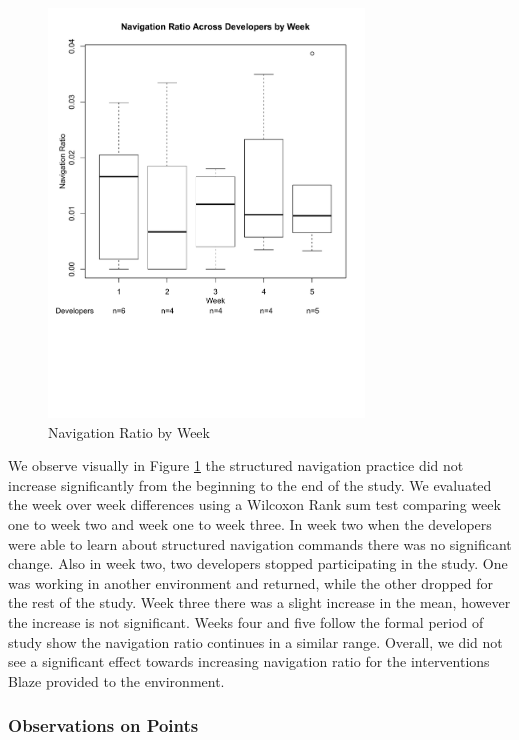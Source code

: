 \documentclass{sig-alternate}
\begin{document}
\begin{figure}
	\includegraphics[width=3.3in]{navratioboxplot_ann.pdf}
	\caption{Navigation Ratio by Week}
	\label{fig:navigationaverage}
\end{figure}

We observe visually in Figure \ref{fig:navigationaverage} the structured navigation practice did not increase significantly from the beginning to the end of the study.  We evaluated the week over week differences using a Wilcoxon Rank sum test \cite{RefWorks:118} comparing week one to week two and week one to week three.    In week two when the developers were able to learn about structured navigation commands there was no significant change.  Also in week two, two developers stopped participating in the study.  One was working in another environment and returned, while the other dropped for the rest of the study.  Week three there was a slight increase in the mean, however the increase is not significant.  Weeks four and five follow the formal period of study show the navigation ratio continues in a similar range.  Overall, we did not see a significant effect towards increasing navigation ratio for the interventions Blaze provided to the environment.    

\subsubsection{Observations on Points}
\end{document}
